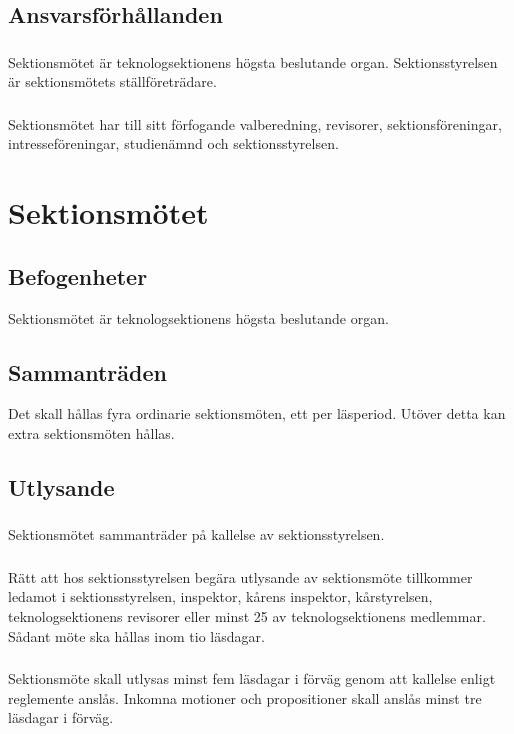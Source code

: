 \documentclass[a4paper, 10pt]{article}
\begin{document}
\subsection{Ansvarsförhållanden}
\subsubsection{}
Sektionsmötet är teknologsektionens högsta beslutande organ. Sektionsstyrelsen är sektionsmötets ställföreträdare.
\subsubsection{}
Sektionsmötet har till sitt förfogande valberedning, revisorer, sektionsföreningar, intresseföreningar, studienämnd och sektionsstyrelsen.
\newpage

\section{Sektionsmötet}
\subsection{Befogenheter}
Sektionsmötet är teknologsektionens högsta beslutande organ.
\subsection{Sammanträden}
Det skall hållas fyra ordinarie sektionsmöten, ett per läsperiod. Utöver detta kan extra sektionsmöten hållas.
\subsection{Utlysande}
\subsubsection{}
Sektionsmötet sammanträder på kallelse av sektionsstyrelsen.
\subsubsection{}
Rätt att hos sektionsstyrelsen begära utlysande av sektionsmöte tillkommer ledamot i sektionsstyrelsen, inspektor, kårens inspektor, kårstyrelsen, teknologsektionens revisorer eller minst 25 av teknologsektionens medlemmar. Sådant möte ska hållas inom tio läsdagar.
\subsubsection{}
\label{sec:sektionsmote_utlysande}
Sektionsmöte skall utlysas minst fem läsdagar i förväg genom att kallelse enligt reglemente anslås. Inkomna motioner och propositioner skall anslås minst tre läsdagar i förväg.
\end{document}
